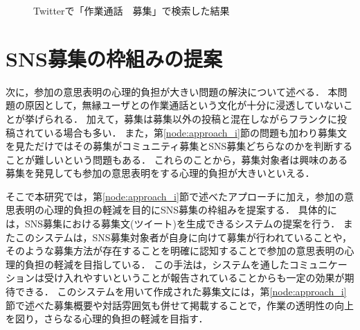 \begin{figure}
    \centering
    \caption{Twitterで「作業通話　募集」で検索した結果}
    \label{fig:tweet_recruitment}
\end{figure}

\section{SNS募集の枠組みの提案}

次に，参加の意思表明の心理的負担が大きい問題の解決について述べる．
本問題の原因として，無縁ユーザとの作業通話という文化が十分に浸透していないことが挙げられる．
加えて，募集は募集以外の投稿と混在しながらフランクに投稿されている場合も多い．
また，第\ref{node:approach_i}節の問題も加わり募集文を見ただけではその募集がコミュニティ募集とSNS募集どちらなのかを判断することが難しいという問題もある．
これらのことから，募集対象者は興味のある募集を発見しても参加の意思表明をする心理的負担が大きいといえる．

そこで本研究では，第\ref{node:approach_i}節で述べたアプローチに加え，参加の意思表明の心理的負担の軽減を目的にSNS募集の枠組みを提案する．
具体的には，SNS募集における募集文(ツイート)を生成できるシステムの提案を行う．
またこのシステムは，SNS募集対象者が自身に向けて募集が行われていることや，そのような募集方法が存在することを明確に認知することで参加の意思表明の心理的負担の軽減を目指している．
この手法は，システムを通したコミュニケーションは受け入れやすいということが報告されていることからも一定の効果が期待できる\cite{Harada}\cite{Kimura}\cite{Nishimura}\cite{Tsuzuki}．
このシステムを用いて作成された募集文には，第\ref{node:approach_i}節で述べた募集概要や対話雰囲気も併せて掲載することで，作業の透明性の向上を図り，さらなる心理的負担の軽減を目指す．
